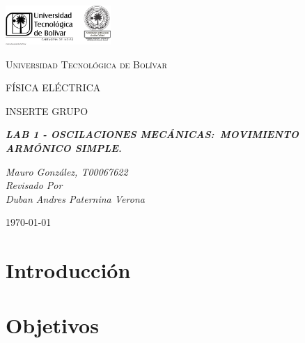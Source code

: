 \documentclass[twocolumn, 12pt]{article}
\begin{document}
\begin{titlepage}
    \centering
    \includegraphics[width=0.3\textwidth]{Images/logo_utb.png}\par\vspace{1cm}
    {\scshape\LARGE Universidad Tecnológica de Bolívar \par}
    \vspace{1cm}

    {\scshape\Large FÍSICA ELÉCTRICA \par}
    \vspace{.2cm}

    {\scshape\Large INSERTE GRUPO \par}
    \vspace{1cm}
    \slshape {\Large \bfseries{}LAB 1 - OSCILACIONES MECÁNICAS:\@{}~MOVIMIENTO ARMÓNICO SIMPLE.\\}
    \vspace{4cm}

    \slshape {\itshape{} Mauro González, T00067622 \\}
    \vfill
    Revisado Por \\
    Duban Andres Paternina Verona\\
    {\large \today\par}
\end{titlepage}

\section{Introducción}

\section{Objetivos}
\end{document}
